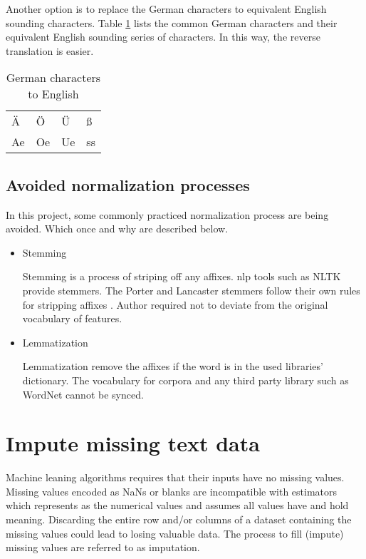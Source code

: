 Another option is to replace the German characters to equivalent English sounding characters. Table \ref{table:deu-eng} lists the common German characters and their equivalent English sounding series of characters. In this way, the reverse translation is easier.
\begin{table}[h]
      \centering
      \caption{German characters to English}
      \label{table:deu-eng}
      \begin{tabular}{ llll }
            \toprule
            \"A& Ö&  Ü&ß \\
            Ae&Oe & Ue&ss\\         
          
            \bottomrule
            \end{tabular}
  \end{table}


  \subsection{Avoided normalization processes}

  In this project, some commonly practiced normalization process are being avoided. Which once and why are described below.

  \begin{itemize}
      \item Stemming 
      
      Stemming is a process of striping off any affixes. \acl{nlp} tools such as NLTK provide stemmers. The Porter and Lancaster
      stemmers follow their own rules for stripping affixes \parencite{BirdKleinLoper09}. Author required not to deviate from the original vocabulary of features.

      \item Lemmatization
      
      Lemmatization remove the affixes if the word is in the used libraries' dictionary. The vocabulary for corpora and any third party library such as WordNet cannot be synced.   

  \end{itemize}



\section{Impute missing text data} \label{ch:data-imputation}

Machine leaning algorithms requires that their inputs have no missing values.
Missing values encoded as NaNs or blanks are incompatible with estimators which represents as the numerical values and assumes all values have and hold meaning. Discarding the entire row and/or columns of a dataset containing the missing values could lead to losing valuable data. The process to fill (impute) missing values are referred to as imputation.

